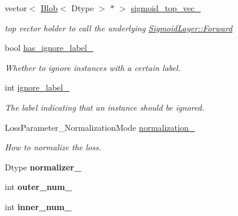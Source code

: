 \begin{DoxyCompactItemize}
vector$<$ \mbox{\hyperlink{classcaffe_1_1_blob}{Blob}}$<$ Dtype $>$ $\ast$ $>$ \mbox{\hyperlink{classcaffe_1_1_sigmoid_cross_entropy_loss_layer_af484b314eb460e0a732c9dc7fccec8ae}{sigmoid\+\_\+top\+\_\+vec\+\_\+}}
\begin{DoxyCompactList}\small\item\em top vector holder to call the underlying \mbox{\hyperlink{classcaffe_1_1_layer_ab57d272dabe8c709d2a785eebe72ca57}{Sigmoid\+Layer\+::\+Forward}} \end{DoxyCompactList}\item 
\mbox{\label{classcaffe_1_1_sigmoid_cross_entropy_loss_layer_a7e2ebf45542532439096caaec42a2a85}} 
bool \mbox{\hyperlink{classcaffe_1_1_sigmoid_cross_entropy_loss_layer_a7e2ebf45542532439096caaec42a2a85}{has\+\_\+ignore\+\_\+label\+\_\+}}
\begin{DoxyCompactList}\small\item\em Whether to ignore instances with a certain label. \end{DoxyCompactList}\item 
\mbox{\label{classcaffe_1_1_sigmoid_cross_entropy_loss_layer_ab99d98ce823df6c90cd4c3cf8b0a793f}} 
int \mbox{\hyperlink{classcaffe_1_1_sigmoid_cross_entropy_loss_layer_ab99d98ce823df6c90cd4c3cf8b0a793f}{ignore\+\_\+label\+\_\+}}
\begin{DoxyCompactList}\small\item\em The label indicating that an instance should be ignored. \end{DoxyCompactList}\item 
\mbox{\label{classcaffe_1_1_sigmoid_cross_entropy_loss_layer_ad4e3c7105f896bd7792e53ef3a0a2dd8}} 
Loss\+Parameter\+\_\+\+Normalization\+Mode \mbox{\hyperlink{classcaffe_1_1_sigmoid_cross_entropy_loss_layer_ad4e3c7105f896bd7792e53ef3a0a2dd8}{normalization\+\_\+}}
\begin{DoxyCompactList}\small\item\em How to normalize the loss. \end{DoxyCompactList}\item 
\mbox{\label{classcaffe_1_1_sigmoid_cross_entropy_loss_layer_a10169a710108bac27a6548cc66934cb5}} 
Dtype {\bfseries normalizer\+\_\+}
\item 
\mbox{\label{classcaffe_1_1_sigmoid_cross_entropy_loss_layer_a3be5cd5a4489be1439bd796c55c033cf}} 
int {\bfseries outer\+\_\+num\+\_\+}
\item 
\mbox{\label{classcaffe_1_1_sigmoid_cross_entropy_loss_layer_ad1e5fb747a0272b5fe90d6264615334b}} 
int {\bfseries inner\+\_\+num\+\_\+}
\end{DoxyCompactItemize}


